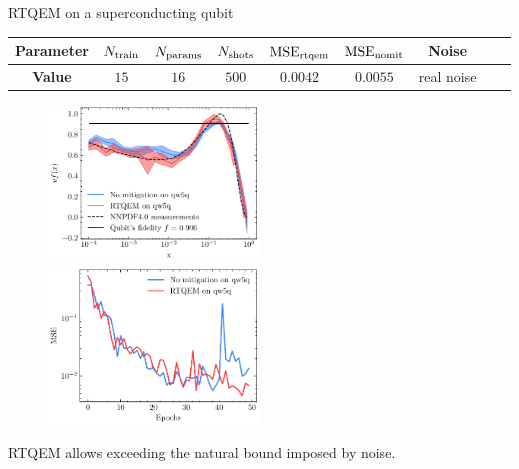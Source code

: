 \documentclass[8pt, xcolor={svgnames}, hyperref={linkcolor=black}]{beamer}
\begin{document}
\begin{frame}{RTQEM on a superconducting qubit}
\begin{center}
\footnotesize
\begin{tabular}{ccccccccc}
\hline \hline 
\rule{0pt}{2.5ex}
\textbf{Parameter} & $N_{\rm train}$ & $N_{\rm params}$ & $N_{\rm shots}$ & $\text{MSE}_{\rm rtqem}$ &  $\text{MSE}_{\rm nomit}$ 
& Noise \\
\hline
\rule{0pt}{2.5ex}
\textbf{Value} & $15$ & $16$ & $500$ & $0.0042$ & $0.0055$ & real noise\\
\hline \hline 
\end{tabular}
\end{center}

\begin{figure}
    \includegraphics[width=0.5\textwidth]{figures/qw5q_short.pdf}%
    \includegraphics[width=0.5\textwidth]{figures/losses_qw5q.pdf}
\end{figure}
\centering
RTQEM allows exceeding the natural bound imposed by noise.
\end{frame}
\end{document}
